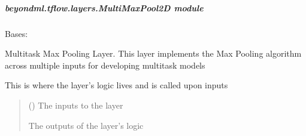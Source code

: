 \documentclass[letterpaper,10pt,english]{sphinxmanual}
\begin{document}
\subparagraph{beyondml.tflow.layers.MultiMaxPool2D module}
\label{\detokenize{beyondml.tflow.layers:module-beyondml.tflow.layers.MultiMaxPool2D}}\label{\detokenize{beyondml.tflow.layers:beyondml-tflow-layers-multimaxpool2d-module}}

\begin{fulllineitems}
\label{\detokenize{beyondml.tflow.layers:beyondml.tflow.layers.MultiMaxPool2D.MultiMaxPool2D}}
\pysigstartsignatures
{}
\pysigstopsignatures
\sphinxAtStartPar
Bases: 

\sphinxAtStartPar
Multitask Max Pooling Layer. This layer implements the Max Pooling algorithm
across multiple inputs for developing multitask models

\begin{fulllineitems}
\label{\detokenize{beyondml.tflow.layers:beyondml.tflow.layers.MultiMaxPool2D.MultiMaxPool2D.call}}
\pysigstartsignatures
{}
\pysigstopsignatures
\sphinxAtStartPar
This is where the layer’s logic lives and is called upon inputs
\begin{quote}\begin{description}
\sphinxAtStartPar
{} () \textendash{} The inputs to the layer

\sphinxAtStartPar
{} \textendash{} The outputs of the layer’s logic


\end{description}
\end{quote}
\end{fulllineitems}
\end{fulllineitems}
\end{document}
